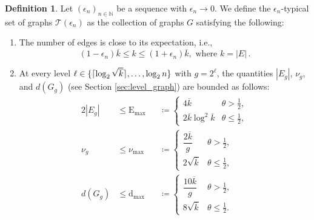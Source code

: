 \documentclass[journal]{IEEEtran}
\newcommand{\rEm}{\mathrm{E}_{\max}}
\theoremstyle{definition}
\theoremstyle{definition}
\newtheorem{definition}{Definition}
\newcommand{\Tc}{\mathcal{T}}
\newcommand{\PV}{\nu}
\newcommand{\kb}{\overline{k}}
\DeclarePairedDelimiter\ceil{\lceil}{\rceil}
\begin{document}
\begin{definition} \label{def:typical}
    Let \( (\epsilon_n)_{n \in \mathbb{N}} \) be a sequence with \( \epsilon_n \to 0 \). We define the \( \epsilon_n \)-typical set of graphs $\Tc(\epsilon_n)$ as the collection of graphs $G$ satisfying the following:  
    
    \begin{enumerate}[label=(\roman*)]
        \item {
        The number of edges is close to its expectation, i.e.,
    \begin{equation}
     (1-\epsilon_n)\kb \leq k \leq (1+\epsilon_n)\kb,  \text{ where }k=|E|\,. \label{eq:k_concentraton}
    \end{equation}
        }
        \item{
        At every level $\ell \in \{\ceil{\log_2 \sqrt{\kb}},\dots,\log_2 n\}$ with $g=2^{\ell}$, the quantities $|E_g|$, $\PV_g$, and $d(G_g)$ (see Section \ref{sec:level_graph}) are bounded as follows:
    \begin{alignat}{2}
      |E_g| &\le \rEm &&\coloneqq 
      \begin{cases}
        4\kb & \theta > \tfrac{1}{2},\\
        2\kb \log^2 \kb & \theta \le \tfrac{1}{2},
      \end{cases} \label{eq:number_edges_level} \\[1em]
      \PV_g & \le \PV_{\max} &&\coloneqq 
      \begin{cases}
        \dfrac{2\kb}{g} & \theta > \tfrac{1}{2},\\
        2\sqrt{\kb} & \theta \le \tfrac{1}{2},
      \end{cases} \label{eq:number_defective_level} \\[1em]
      d(G_g) &\le \mathrm{d}_{\max} &&\coloneqq 
      \begin{cases}
        \dfrac{10\kb}{g} & \theta > \tfrac{1}{2},\\
        8\sqrt{\kb} & \theta \le \tfrac{1}{2}.
      \end{cases} \label{eq:degree_level}
    \end{alignat}
        }
    \end{enumerate}
\end{definition}
\end{document}
